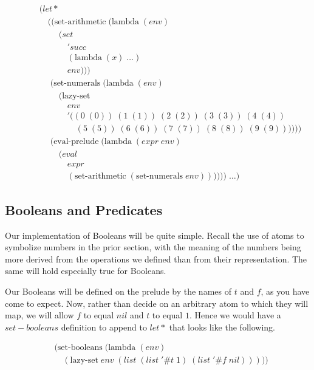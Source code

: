 \begin{figure}[ht]
\caption{}\label{scheme}
\begin{align*}
& (let* \; 
\\& \quad ((\text{set-arithmetic} \; (\text{lambda} \; (env)
\\& \qquad \; (set
\\& \qquad \quad \; 'succ
\\& \qquad \quad \; (\text{lambda} \; (x) \; \dots)
\\& \qquad \quad \; env)))
\\& \quad \; (\text{set-numerals} \; (\text{lambda} \; (env) \; 
\\& \qquad \; (\text{lazy-set} \; 
\\& \qquad \quad \; env \; 
\\& \qquad \quad \; '((0 \; (0)) \; (1 \; (1)) \; (2 \; (2)) \; (3 \; (3)) \; (4 \; (4)) \; 
\\& \qquad \qquad \; (5 \; (5)) \; (6 \; (6)) \; (7 \; (7)) \; (8 \; (8)) \; (9 \; (9))))))
\\& \quad \; (\text{eval-prelude} \; (\text{lambda} \; (expr \; env)
\\& \qquad \; (eval \; 
\\& \qquad \quad \; expr
\\& \qquad \quad \; (\text{set-arithmetic} \; (\text{set-numerals} \; env)))))) \; \dots)
\end{align*}
\end{figure}

\subsection{Booleans and Predicates}
Our implementation of Booleans will be quite simple. Recall the use of atoms 
to symbolize numbers in the prior section, with the meaning of the numbers 
being more derived from the operations we defined than from their 
representation. The same will hold especially true for Booleans.

Our Booleans will be defined on the prelude by the names of $t$ and $f$, as 
you have come to expect. Now, rather than decide on an arbitrary atom to 
which they will map, we will allow $f$ to equal $nil$ and $t$ to equal $1$. 
Hence we would have a $set-booleans$ definition to append to $let*$ that 
looks like the following.

\begin{figure}[ht]
\caption{}\label{scheme}
\begin{align*}
& (\text{set-booleans} \; (\text{lambda} \; (env)
\\& \quad (\text{lazy-set} \; env \; (list \; (list \; '\#t \; 1) \; (list \; '\#f \; nil)))))
\end{align*}
\end{figure}

